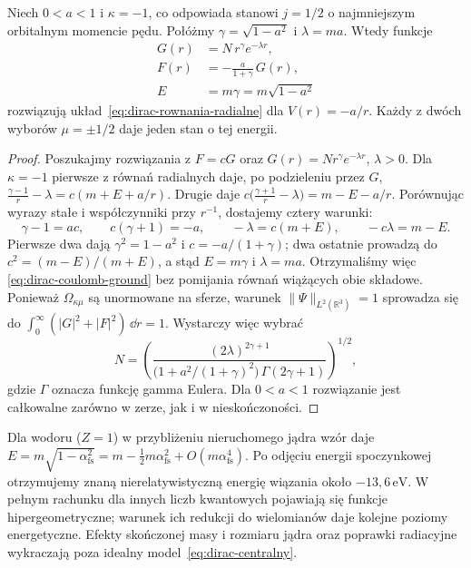 \begin{przyklad}
\label{prz:dirac-coulomb-ground}
Niech $0<a<1$ i $\kappa=-1$, co odpowiada
stanowi $j=1/2$ o najmniejszym orbitalnym
momencie pędu. Połóżmy
$\gamma=\sqrt{1-a^2}$ i $\lambda=ma$.
Wtedy funkcje
\begin{equation}\label{eq:dirac-coulomb-ground}
 \begin{aligned}
 G(r)&=N\,r^{\gamma}e^{-\lambda r},\\
 F(r)&=-\frac{a}{1+\gamma}\,G(r),\\
 E&=m\gamma=m\sqrt{1-a^2}
 \end{aligned}
\end{equation}
rozwiązują układ~\eqref{eq:dirac-rownania-radialne}
dla $V(r)=-a/r$. Każdy z dwóch wyborów
$\mu=\pm1/2$ daje jeden stan o tej energii.
\end{przyklad}
\begin{proof}
Poszukajmy rozwiązania z $F=cG$ oraz
$G(r)=Nr^\gamma e^{-\lambda r}$, $\lambda>0$.
Dla $\kappa=-1$ pierwsze z równań radialnych
daje, po podzieleniu przez $G$,
$\frac{\gamma-1}{r}-\lambda
=c(m+E+a/r)$.
Drugie daje
$c\bigl(\frac{\gamma+1}{r}-\lambda\bigr)
=m-E-a/r$.
Porównując wyrazy stałe i współczynniki przy
$r^{-1}$, dostajemy cztery warunki:
\[
 \gamma-1=ac,\qquad c(\gamma+1)=-a,
 \qquad -\lambda=c(m+E),\qquad -c\lambda=m-E.
\]
Pierwsze dwa dają $\gamma^2=1-a^2$ i
$c=-a/(1+\gamma)$; dwa ostatnie prowadzą do
$c^2=(m-E)/(m+E)$, a stąd $E=m\gamma$
i $\lambda=ma$. Otrzymaliśmy więc
\eqref{eq:dirac-coulomb-ground} bez pomijania
równań wiążących obie składowe.
Ponieważ $\Omega_{\kappa\mu}$ są unormowane
na sferze, warunek $\|\Psi\|_{L^2(\mathbb R^3)}=1$
sprowadza się do
$\int_0^\infty(|G|^2+|F|^2)\,\dd r=1$.
Wystarczy więc wybrać
\[
 N=\left(\frac{(2\lambda)^{2\gamma+1}}
 {\bigl(1+a^2/(1+\gamma)^2\bigr)\,
  \Gamma(2\gamma+1)}\right)^{1/2},
\]
gdzie $\Gamma$ oznacza funkcję gamma Eulera.
Dla $0<a<1$ rozwiązanie jest całkowalne
zarówno w zerze, jak i w nieskończoności.
\end{proof}

Dla wodoru ($Z=1$) w przybliżeniu nieruchomego
jądra wzór daje
$E=m\sqrt{1-\alpha_{\mathrm{fs}}^2}
 =m-\tfrac12m\alpha_{\mathrm{fs}}^2
 +O(m\alpha_{\mathrm{fs}}^4)$.
Po odjęciu energii spoczynkowej otrzymujemy
znaną nierelatywistyczną energię wiązania
około $-13{,}6\,\mathrm{eV}$.
W pełnym rachunku dla innych liczb kwantowych
pojawiają się funkcje hipergeometryczne;
warunek ich redukcji do wielomianów daje
kolejne poziomy energetyczne. Efekty skończonej
masy i rozmiaru jądra oraz poprawki radiacyjne
wykraczają poza idealny model~\eqref{eq:dirac-centralny}.

